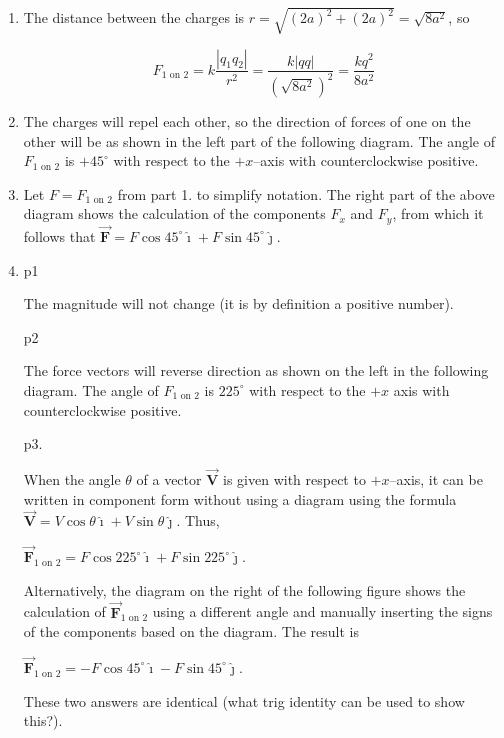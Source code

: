\documentclass{article}
\renewcommand{\mbox}{\text}
\newcommand{\ihat}[0]{\hat{\boldsymbol{\imath}}}
\newcommand{\jhat}[0]{\hat{\boldsymbol{\jmath}}}
\newcommand{\bfvec}[1]{\vec{\mathbf{#1}}}
\begin{document}
\begin{enumerate}

  \item The distance between the charges is $r=\sqrt{(2a)^2+(2a)^2}=\sqrt{8a^2}$, so

        $$F_{1\mbox{ on } 2}=k\frac{|q_1q_2|}{r^2}=\frac{k|qq|}{(\sqrt{8a^2})^2}=\frac{kq^2}{8a^2}$$

  \item The charges will repel each other, so the direction of forces of one on the other will be as shown in the left part of the following diagram. The angle of $F_{1\mbox{ on } 2}$ is $+45^\circ$ with respect to the $+x$--axis with counterclockwise positive.

        

  \item Let $F = F_{1\mbox{ on } 2}$ from part 1. to simplify notation. The right part of the above diagram shows the calculation of the components $F_x$ and $F_y$, from which it follows that $\bfvec{F} = F\cos 45^\circ \ihat + F\sin 45^\circ \jhat$.

  \item 

        p1

        The magnitude will not change (it is by definition a positive number).

        p2

        The force vectors will reverse direction as shown on the left in the following diagram. The angle of $F_{1\mbox{ on } 2}$ is $225^\circ$ with respect to the $+x$ axis with counterclockwise positive.

        p3.

        When the angle $\theta$ of a vector $\bfvec{V}$ is given with respect to $+x$--axis, it can be written in component form without using a diagram using the formula $\bfvec{V} = V\cos\theta\ihat + V\sin\theta\jhat$. Thus,

        $\bfvec{F}_{1\mbox{ on } 2} = F\cos 225^\circ \ihat + F\sin 225^\circ \jhat$.

        Alternatively, the diagram on the right of the following figure shows the calculation of $\bfvec{F}_{1\mbox{ on } 2}$ using a different angle and manually inserting the signs of the components based on the diagram. The result is

        $\bfvec{F}_{1\mbox{ on } 2} = -F\cos 45^\circ \ihat - F\sin 45^\circ \jhat$.

        These two answers are identical (what trig identity can be used to show this?).


\end{enumerate}
\end{document}
